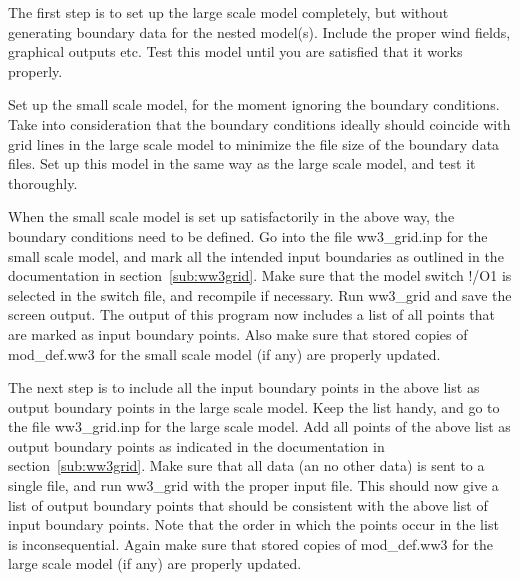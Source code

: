 \begin{list}{)}{
             \rightmargin 5mm 
              \leftmargin 10mm}

\item The first step is to set up the large scale model completely, but
      without generating boundary data for the nested model(s). Include the
      proper wind fields, graphical outputs etc. Test this model until you are
      satisfied that it works properly.

\item Set up the small scale model, for the moment ignoring the boundary
      conditions. Take into consideration that the boundary conditions ideally
      should coincide with grid lines in the large scale model to minimize the
      file size of the boundary data files. Set up this model in the same way
      as the large scale model, and test it thoroughly.

\item When the small scale model is set up satisfactorily in the above way,
      the boundary conditions need to be defined. Go into the file {\file
      ww3\_grid.inp} for the small scale model, and mark all the intended
      input boundaries as outlined in the documentation in
      section~\ref{sub:ww3grid}. Make sure that the model switch {\F !/O1} is
      selected in the {\file switch} file, and recompile if necessary. Run
      {\code ww3\_grid} and save the screen output. The output of this program
      now includes a list of all points that are marked as input boundary
      points. Also make sure that stored copies of {\file mod\_def.ww3} for
      the small scale model (if any) are properly updated.

\item The next step is to include all the input boundary points in the above
      list as output boundary points in the large scale model. Keep the list
      handy, and go to the file {\file ww3\_grid.inp} for the large scale
      model. Add all points of the above list as output boundary points as
      indicated in the documentation in section~\ref{sub:ww3grid}. Make sure
      that all data (an no other data) is sent to a single file, and run
      {\code ww3\_grid} with the proper input file. This should now give a
      list of output boundary points that should be consistent with the above
      list of input boundary points. Note that the order in which the points
      occur in the list is inconsequential. Again make sure that stored copies
      of {\file mod\_def.ww3} for the large scale model (if any) are properly
      updated.


\end{list}
